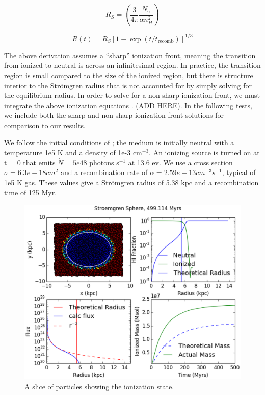 \begin{equation}
\label{eq:strmogrenradius}
R_S = \left( \frac{3}{4\pi} \frac{\dot{N_{\gamma}}}{\alpha n_H^2}\right)
\end{equation}

\begin{equation}
\label{eq:stromgrentime}
R(t) = R_S[1-\exp{(t/t_{\mbox{recomb}})}]^{1/3}
\end{equation}

The above derivation assumes a ``sharp'' ionization front, meaning the transition from ionized to neutral is across an infinitesimal region. In practice, the transition region is small compared to the size of the ionized region, but there is structure interior to the Str\"omgren radius that is not accounted for by simply solving for the equilibrium radius. In order to solve for a non-sharp ionization front, we must integrate the above ionization equations \citep{osterbrockFerland2006}. (ADD HERE). In the following tests, we include both the sharp and non-sharp ionization front solutions for comparison to our results.

We follow the initial conditions of \citet{ilievEt06}; the medium is initially neutral with a temperature 1e5 K and a density of 1e-3 cm$^{-3}$. An ionizing source is turned on at t = 0 that emits $\dot{N} = 5e48$ photons s$^{-1}$ at 13.6 ev. We use a cross section $\sigma = 6.3e-18 cm^2$ and a recombination rate of $\alpha = 2.59e-13 cm^{-3} s^{-1}$, typical of 1e5 K gas. These values give a Str\"omgren radius of 5.38 kpc and a recombination time of 125 Myr.

\begin{figure}
\includegraphics[width=\textwidth]{graphics/ifront6401000.eps}
\caption[The isothermal Str\"omgren Sphere.]{A slice of particles showing the ionization state.}
\label{fig:stromgreniso}
\end{figure}

